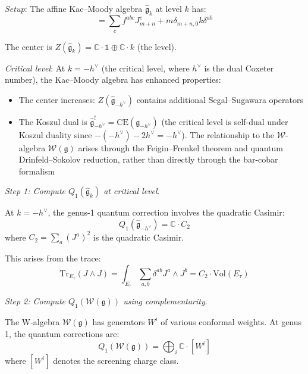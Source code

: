 \begin{example}
\label{ex:kac-moody-complementarity-explicit}

\emph{Setup}: The affine Kac--Moody algebra $\widehat{\mathfrak{g}}_k$ at level $k$ 
has:
\begin{equation}
[J^a_m, J^b_n] = \sum_c f^{abc} J^c_{m+n} + m\delta_{m+n,0} k \delta^{ab}
\end{equation}

The center is $Z(\widehat{\mathfrak{g}}_k) = \mathbb{C} \cdot \mathbb{1} \oplus 
\mathbb{C} \cdot k$ (the level).

\emph{Critical level}: At $k = -h^\vee$ (the critical level, where $h^\vee$ is the 
dual Coxeter number), the Kac--Moody algebra has enhanced properties:
\begin{itemize}
\item The center increases: $Z(\widehat{\mathfrak{g}}_{-h^\vee})$ contains additional 
Segal--Sugawara operators
\item The Koszul dual is $\widehat{\mathfrak{g}}_{-h^\vee}^! = \mathrm{CE}(\mathfrak{g}_{-h^\vee})$ (the critical level is self-dual under Koszul duality since $-(-h^\vee) - 2h^\vee = -h^\vee$). The relationship to the $\mathcal{W}$-algebra $\mathcal{W}(\mathfrak{g})$ arises through the Feigin--Frenkel theorem and quantum Drinfeld--Sokolov reduction, rather than directly through the bar-cobar formalism
\end{itemize}

\emph{Step 1: Compute $Q_1(\widehat{\mathfrak{g}}_k)$ at critical level}.

At $k = -h^\vee$, the genus-1 quantum correction involves the quadratic Casimir:
\begin{equation}
Q_1(\widehat{\mathfrak{g}}_{-h^\vee}) = \mathbb{C} \cdot C_2
\end{equation}
where $C_2 = \sum_a (J^a)^2$ is the quadratic Casimir.

This arises from the trace:
\begin{equation}
\text{Tr}_{E_\tau}(J \wedge J) = \int_{E_\tau} \sum_{a,b} \delta^{ab} J^a \wedge J^b 
= C_2 \cdot \text{Vol}(E_\tau)
\end{equation}

\emph{Step 2: Compute $Q_1(\mathcal{W}(\mathfrak{g}))$ using complementarity}.

The W-algebra $\mathcal{W}(\mathfrak{g})$ has generators $W^i$ of various conformal 
weights. At genus 1, the quantum corrections are:
\begin{equation}
Q_1(\mathcal{W}(\mathfrak{g})) = \bigoplus_{i} \mathbb{C} \cdot [W^i]
\end{equation}
where $[W^i]$ denotes the screening charge class.


\end{example}
